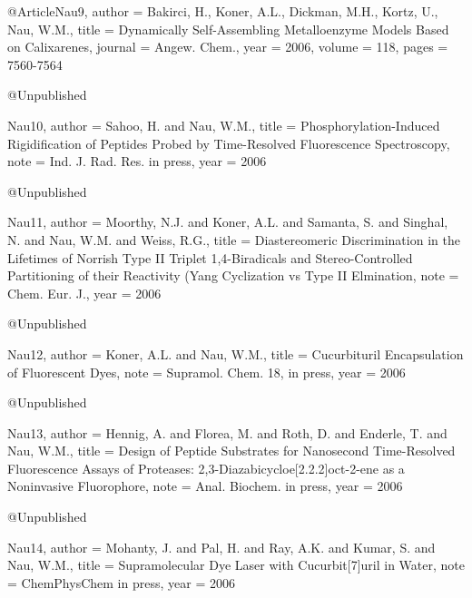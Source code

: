 @Article{Nau9,
  author =   {Bakirci, H., Koner, A.L., Dickman, M.H., Kortz, U., Nau, W.M.},
  title =    {Dynamically Self-Assembling Metalloenzyme Models Based on Calixarenes},
  journal =      {Angew. Chem.},
  year =     {2006},
  volume =    {118},
  pages =     {7560-7564}
}



@Unpublished{Nau10,
  author =   {Sahoo, H. and Nau,  W.M.},
  title =    {Phosphorylation-Induced Rigidification of Peptides Probed by Time-Resolved Fluorescence Spectroscopy},
  note =     {Ind. J. Rad. Res. in press},
  year =      {2006}

}

@Unpublished{Nau11,
  author =   {Moorthy, N.J. and Koner, A.L. and Samanta, S. and Singhal, N. and Nau, W.M. and Weiss, R.G.},
  title =    {Diastereomeric Discrimination in the Lifetimes of Norrish Type II Triplet 1,4-Biradicals and
  Stereo-Controlled Partitioning of their Reactivity (Yang Cyclization vs Type II Elmination},
  note =     {Chem. Eur. J.},
  year =      {2006}

}

@Unpublished{Nau12,
  author =   {Koner, A.L. and Nau, W.M.},
  title =    {Cucurbituril Encapsulation of Fluorescent Dyes},
  note =     {Supramol. Chem. 18, in press},
  year =      {2006}

} @Unpublished{Nau13,
  author =   {Hennig, A. and Florea, M. and Roth, D. and Enderle, T. and Nau, W.M.},
  title =    {Design of Peptide Substrates for Nanosecond Time-Resolved Fluorescence Assays of
  Proteases: 2,3-Diazabicycloe[2.2.2]oct-2-ene as a Noninvasive Fluorophore},
  note =     {Anal. Biochem. in press},
  year =      {2006}

}

@Unpublished{Nau14,
  author =   {Mohanty, J. and Pal, H. and Ray, A.K. and Kumar, S. and Nau, W.M.},
  title =    {Supramolecular Dye Laser with Cucurbit[7]uril in Water},
  note =     {ChemPhysChem in press},
  year =      {2006}

}
